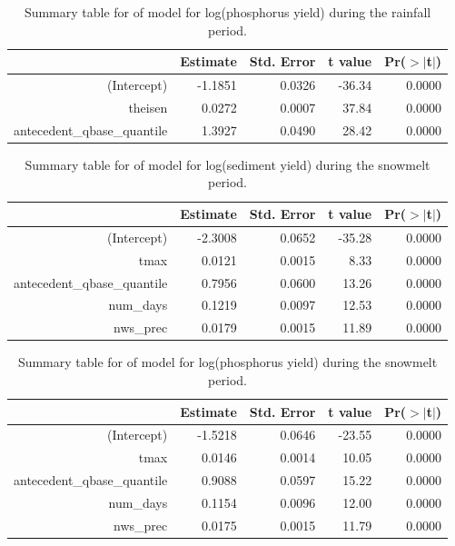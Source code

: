 \documentclass[10pt]{article}
\begin{document}
\begin{table}[ht]
\begin{center}
\begin{tabular}{rrrrr}
  \hline
 & Estimate & Std. Error & t value & Pr($>$$|$t$|$) \\ 
  \hline
(Intercept) & -1.1851 & 0.0326 & -36.34 & 0.0000 \\ 
  theisen & 0.0272 & 0.0007 & 37.84 & 0.0000 \\ 
  antecedent\_qbase\_quantile & 1.3927 & 0.0490 & 28.42 & 0.0000 \\ 
   \hline
\end{tabular}
\caption{Summary table for of model for log(phosphorus yield) during the rainfall period.}
\end{center}
\end{table}

\begin{table}[ht]
\begin{center}
\begin{tabular}{rrrrr}
  \hline
 & Estimate & Std. Error & t value & Pr($>$$|$t$|$) \\ 
  \hline
(Intercept) & -2.3008 & 0.0652 & -35.28 & 0.0000 \\ 
  tmax & 0.0121 & 0.0015 & 8.33 & 0.0000 \\ 
  antecedent\_qbase\_quantile & 0.7956 & 0.0600 & 13.26 & 0.0000 \\ 
  num\_days & 0.1219 & 0.0097 & 12.53 & 0.0000 \\ 
  nws\_prec & 0.0179 & 0.0015 & 11.89 & 0.0000 \\ 
   \hline
\end{tabular}
\caption{Summary table for of model for log(sediment yield) during the snowmelt period.}
\end{center}
\end{table}

\begin{table}[ht]
\begin{center}
\begin{tabular}{rrrrr}
  \hline
 & Estimate & Std. Error & t value & Pr($>$$|$t$|$) \\ 
  \hline
(Intercept) & -1.5218 & 0.0646 & -23.55 & 0.0000 \\ 
  tmax & 0.0146 & 0.0014 & 10.05 & 0.0000 \\ 
  antecedent\_qbase\_quantile & 0.9088 & 0.0597 & 15.22 & 0.0000 \\ 
  num\_days & 0.1154 & 0.0096 & 12.00 & 0.0000 \\ 
  nws\_prec & 0.0175 & 0.0015 & 11.79 & 0.0000 \\ 
   \hline
\end{tabular}
\caption{Summary table for of model for log(phosphorus yield) during the snowmelt period.}
\end{center}
\end{table}
\end{document}
